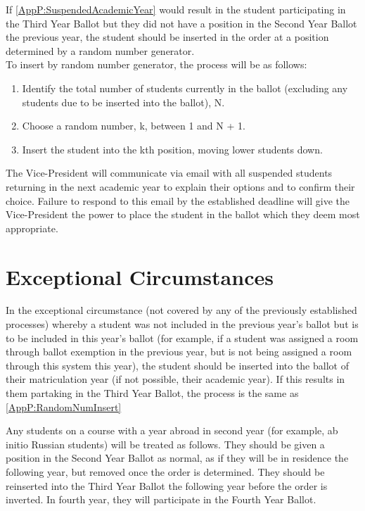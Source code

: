 \npara \label{AppP:RandomNumInsert} If  \ref{AppP:SuspendedAcademicYear} would result in the student participating in the Third Year Ballot but they did not have a position in the Second Year Ballot the previous year, the student should be inserted in the order at a position determined by a random number generator. \\ 
To insert by random number generator, the process will be as follows: 
\begin{enumerate}
\item Identify the total number of students currently in the ballot (excluding any students due to be inserted into the ballot), N.
\item Choose a random number, k, between 1 and N + 1.
\item Insert the student into the kth position, moving lower students down.
\end{enumerate}
\npara The Vice-President will communicate via email with all suspended students returning in the next academic year to explain their options and to confirm their choice. Failure to respond to this email by the established deadline will give the Vice-President the power to place the student in the ballot which they deem most appropriate.

\section{Exceptional Circumstances}
\npara \label{AppP:ExceptionalRNI} In the exceptional circumstance (not covered by any of the previously established processes) whereby a student was not included in the previous year’s ballot but is to be included in this year’s ballot (for example, if a student was assigned a room through ballot exemption in the previous year, but is not being assigned a room through this system this year), the student should be inserted into the ballot of their matriculation year (if not possible, their academic year). If this results in them partaking in the Third Year Ballot, the process is the same as \ref{AppP:RandomNumInsert}

\npara Any students on a course with a year abroad in second year (for example, ab initio Russian students) will be treated as follows. They should be given a position in the Second Year Ballot as normal, as if they will be in residence the following year, but removed once the order is determined. They should be reinserted into the Third Year Ballot the following year before the order is inverted. In fourth year, they will participate in the Fourth Year Ballot.

